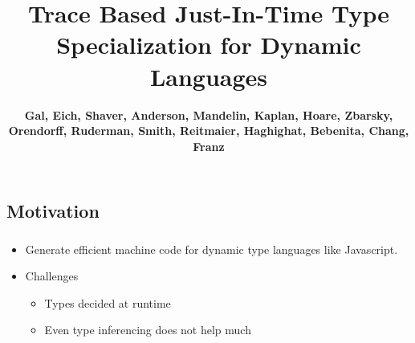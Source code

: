 \documentclass[mathserif,10pt]{beamer}
\title{Trace Based Just-In-Time Type Specialization for Dynamic Languages}
\author{{\textbf{Gal, Eich, Shaver, Anderson, Mandelin, Kaplan, Hoare, Zbarsky, Orendorff, Ruderman, Smith, Reitmaier, Haghighat, Bebenita, Chang, Franz}} }
\newcommand{\cmt}[1]{}
\begin{document}
  \begin{frame}
  \titlepage
  \end{frame}

\frame
{
}

\subsection{Motivation}
\frame
{
  \frametitle{\subsecname}
  \begin{itemize}
  \item Generate efficient machine code for dynamic type languages like Javascript. \\
  \item Challenges
    \begin{itemize}
      \item Types decided at runtime
      \item Even type inferencing does not help much
    \end{itemize}
  \end{itemize}
}
\cmt{Applications written in modern dynamic languages such as Java or .NET are shipped in
the form of high-level intermediate bytecode. This offers two distinct advantages over
shipping programs directly as compiled machine code. On the one hand the bytecode is
architecture independent and can be executed on different target systems using different
native instruction sets and software frameworks (i.e. operating systems). This makes
bytecode programs portable across target platforms.

Without static information about the types of res and v, a JIT
compiler must emit code to handle all possible combinations of
operand types. Moreover, every time values are copied around, the
compiler must emit code to keep track of the types of the involved
values, using either a separate type tag for the value or a specialized
marshaling format. This incurs a large runtime overhead on the
generated code, greatly increases the complexity of the compiler,
and makes effective implementation of important optimizations
like register allocation and loop invariant code motion much harder
}
\end{document}
